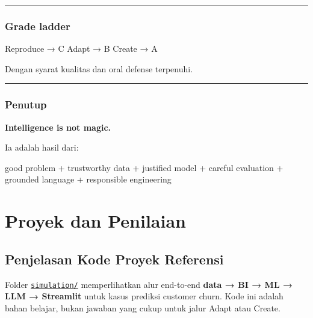 \documentclass[
  indonesian,
  letterpaper,
  DIV=11,
  numbers=noendperiod]{scrreprt}
\newenvironment{Shaded}{\begin{snugshade}}{\end{snugshade}}
\newcommand{\NormalTok}[1]{\textcolor[rgb]{0.00,0.23,0.31}{#1}}
\begin{document}
\begin{center}\rule{0.5\linewidth}{0.5pt}\end{center}

\section{Grade ladder}\label{grade-ladder}

\begin{Shaded}
\begin{Highlighting}[]
\NormalTok{Reproduce → C}
\NormalTok{Adapt     → B}
\NormalTok{Create    → A}
\end{Highlighting}
\end{Shaded}

Dengan syarat kualitas dan oral defense terpenuhi.

\begin{center}\rule{0.5\linewidth}{0.5pt}\end{center}

\section{Penutup}\label{penutup}

\textbf{Intelligence is not magic.}

Ia adalah hasil dari:

\begin{Shaded}
\begin{Highlighting}[]
\NormalTok{good problem}
\NormalTok{+ trustworthy data}
\NormalTok{+ justified model}
\NormalTok{+ careful evaluation}
\NormalTok{+ grounded language}
\NormalTok{+ responsible engineering}
\end{Highlighting}
\end{Shaded}

\part{Proyek dan Penilaian}

\chapter{Penjelasan Kode Proyek
Referensi}\label{penjelasan-kode-proyek-referensi}

Folder \href{simulation/}{\texttt{simulation/}} memperlihatkan alur
end-to-end \textbf{data → BI → ML → LLM → Streamlit} untuk kasus
prediksi customer churn. Kode ini adalah bahan belajar, bukan jawaban
yang cukup untuk jalur Adapt atau Create.
\end{document}
